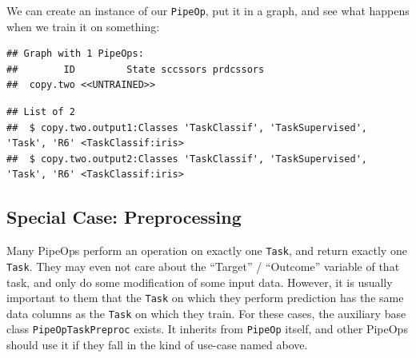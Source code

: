 \documentclass[]{scrbook}
\newenvironment{Shaded}{\begin{snugshade}}{\end{snugshade}}
\newcommand{\KeywordTok}[1]{\textcolor[rgb]{0.13,0.29,0.53}{\textbf{#1}}}
\newcommand{\NormalTok}[1]{#1}
\newcommand{\OperatorTok}[1]{\textcolor[rgb]{0.81,0.36,0.00}{\textbf{#1}}}
\newcommand{\StringTok}[1]{\textcolor[rgb]{0.31,0.60,0.02}{#1}}
\renewenvironment{Shaded} {\begin{snugshade}\small} {\end{snugshade}}
\begin{document}
We can create an instance of our \texttt{PipeOp}, put it in a graph, and see what happens when we train it on something:

\begin{Shaded}
\end{Shaded}

\begin{verbatim}
## Graph with 1 PipeOps:
##        ID         State sccssors prdcssors
##  copy.two <<UNTRAINED>>
\end{verbatim}

\begin{Shaded}
\end{Shaded}

\begin{verbatim}
## List of 2
##  $ copy.two.output1:Classes 'TaskClassif', 'TaskSupervised', 'Task', 'R6' <TaskClassif:iris> 
##  $ copy.two.output2:Classes 'TaskClassif', 'TaskSupervised', 'Task', 'R6' <TaskClassif:iris>
\end{verbatim}

\hypertarget{ext-pipe-preproc}{%
\subsection{Special Case: Preprocessing}\label{ext-pipe-preproc}}

Many PipeOps perform an operation on exactly one \texttt{Task}, and return exactly one \texttt{Task}. They may even not care about the ``Target'' / ``Outcome'' variable of that task, and only do some modification of some input data.
However, it is usually important to them that the \texttt{Task} on which they perform prediction has the same data columns as the \texttt{Task} on which they train.
For these cases, the auxiliary base class \texttt{PipeOpTaskPreproc} exists.
It inherits from \texttt{PipeOp} itself, and other PipeOps should use it if they fall in the kind of use-case named above.
\end{document}

